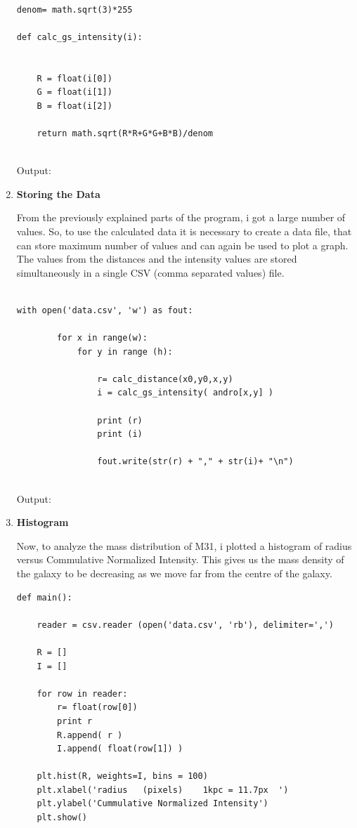 \begin{enumerate}
\begin{verbatim}

denom= math.sqrt(3)*255

def calc_gs_intensity(i):


    R = float(i[0])
    G = float(i[1])
    B = float(i[2])

    return math.sqrt(R*R+G*G+B*B)/denom


\end{verbatim}

Output:

\item \textbf{Storing the Data}

From the previously explained parts of the program, i got a large number of values. So, to use the calculated data it is necessary to create a data file, that can store maximum number of values and can again be used to plot a graph. The values from the distances and the intensity values are stored simultaneously in a single CSV (comma separated values) file.
\begin{verbatim}

with open('data.csv', 'w') as fout:

        for x in range(w):
            for y in range (h):

                r= calc_distance(x0,y0,x,y)
                i = calc_gs_intensity( andro[x,y] )

                print (r)
                print (i)

                fout.write(str(r) + "," + str(i)+ "\n")


\end{verbatim}
Output:

\item \textbf{Histogram}

Now, to analyze the mass distribution of M31, i plotted a histogram of radius versus Commulative Normalized Intensity. This gives us the mass density of the galaxy to be decreasing as we move far from the centre of the galaxy.
\begin{verbatim}
def main():

    reader = csv.reader (open('data.csv', 'rb'), delimiter=',')

    R = []
    I = []

    for row in reader:
        r= float(row[0])
        print r
        R.append( r )
        I.append( float(row[1]) )

    plt.hist(R, weights=I, bins = 100)
    plt.xlabel('radius   (pixels)    1kpc = 11.7px  ')
    plt.ylabel('Cummulative Normalized Intensity')
    plt.show()


\end{verbatim}
\end{enumerate}
